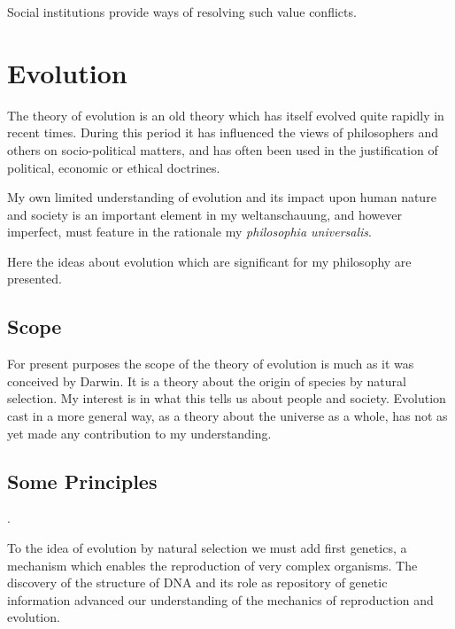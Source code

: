 \documentclass{rbjk}
\begin{document}
\begin{article}
Social institutions provide ways of resolving such value conflicts.

\section{Evolution}

The theory of evolution is an old theory which has itself evolved quite rapidly in recent times.
During this period it has influenced the views of philosophers and others on socio-political matters, and has often been used in the justification of political, economic or ethical doctrines.

My own limited understanding of evolution and its impact upon human nature and society is an important element in my weltanschauung, and however imperfect, must feature in the rationale my {\it philosophia universalis}.

Here the ideas about evolution which are significant for my philosophy are presented.

\subsection{Scope}

For present purposes the scope of the theory of evolution is much as it was conceived by Darwin.
It is a theory about the origin of species by natural selection.
My interest is in what this tells us about people and society.
Evolution cast in a more general way, as a theory about the universe as a whole, has not as yet made any contribution to my understanding.

\subsection{Some Principles}.

To the idea of evolution by natural selection we must add first genetics, a mechanism which enables the reproduction of very complex organisms.
The discovery of the structure of DNA and its role as repository of genetic information advanced our understanding of the mechanics of reproduction and evolution.






%
%

\end{article}
\end{document}
